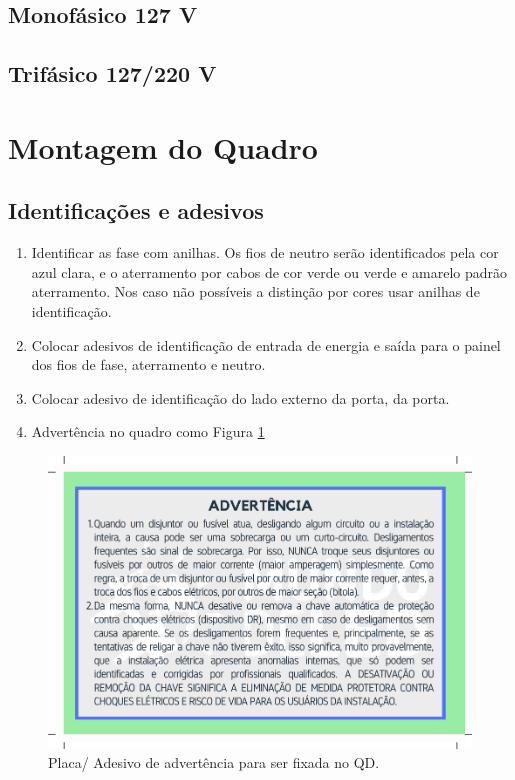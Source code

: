 \subsection{Monofásico 127 V}
\subsection{Trifásico 127/220 V}

\section{Montagem do Quadro}

\subsection{Identificações e adesivos}
\begin{enumerate}
\item Identificar as fase com anilhas. Os fios de neutro serão identificados pela cor azul clara, e o aterramento por cabos de cor verde ou verde e amarelo padrão aterramento. Nos caso não possíveis a distinção por cores usar anilhas de identificação.
\item Colocar adesivos de identificação de entrada de energia e saída para o painel dos fios de fase, aterramento e neutro.
\item  Colocar adesivo de identificação do lado externo da porta, da porta.
\item Advertência no quadro como Figura \ref{fig:advQD}
\end{enumerate}


\begin{figure}[ht]
    \centering
    \includegraphics[scale=0.5]{image/EtiqAdvQD.pdf}
    \caption{Placa/ Adesivo de advertência para ser fixada no QD.}
    \label{fig:advQD}
\end{figure}

